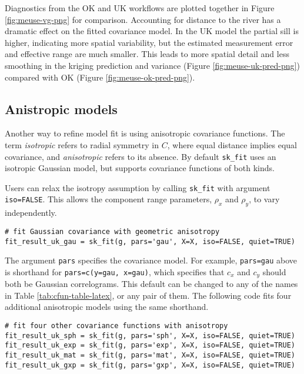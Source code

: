 Diagnostics from the OK and UK workflows are plotted together in Figure \ref{fig:meuse-vg-png} for comparison. Accounting for distance to the river has a dramatic effect on the fitted covariance model. In the UK model the partial sill is higher, indicating more spatial variability, but the estimated measurement error and effective range are much smaller. This leads to more spatial detail and less smoothing in the kriging prediction and variance (Figure \ref{fig:meuse-uk-pred-png}) compared with OK (Figure \ref{fig:meuse-ok-pred-png}).

\hypertarget{anistropic-models}{%
\subsection{Anistropic models}\label{anistropic-models}}

Another way to refine model fit is using anisotropic covariance functions. The term \emph{isotropic} refers to radial symmetry in \(C\), where equal distance implies equal covariance, and \emph{anisotropic} refers to its absence. By default \texttt{sk\_fit} uses an isotropic Gaussian model, but  supports covariance functions of both kinds.

Users can relax the isotropy assumption by calling \texttt{sk\_fit} with argument \texttt{iso=FALSE}. This allows the component range parameters, \(\rho_x\) and \(\rho_y\), to vary independently.

\begin{verbatim}
# fit Gaussian covariance with geometric anisotropy
fit_result_uk_gau = sk_fit(g, pars='gau', X=X, iso=FALSE, quiet=TRUE)
\end{verbatim}

The argument \texttt{pars} specifies the covariance model. For example, \texttt{pars=\textquotesingle{}gau\textquotesingle{}} above is shorthand for \texttt{pars=c(y=\textquotesingle{}gau\textquotesingle{},\ x=\textquotesingle{}gau\textquotesingle{})}, which specifies that \(c_x\) and \(c_y\) should both be Gaussian correlograms. This default can be changed to any of the names in Table \ref{tab:cfun-table-latex}, or any pair of them. The following code fits four additional anisotropic models using the same shorthand.

\begin{verbatim}
# fit four other covariance functions with anisotropy
fit_result_uk_sph = sk_fit(g, pars='sph', X=X, iso=FALSE, quiet=TRUE)
fit_result_uk_exp = sk_fit(g, pars='exp', X=X, iso=FALSE, quiet=TRUE)
fit_result_uk_mat = sk_fit(g, pars='mat', X=X, iso=FALSE, quiet=TRUE)
fit_result_uk_gxp = sk_fit(g, pars='gxp', X=X, iso=FALSE, quiet=TRUE)
\end{verbatim}

